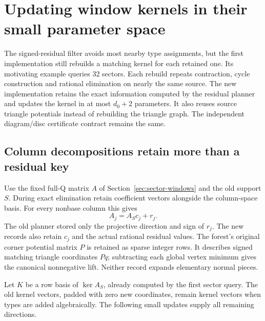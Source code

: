 \section{Updating window kernels in their small parameter space}
\label{sec:window-basis}

The signed-residual filter avoids most nearby type assignments, but the
first implementation still rebuilds a matching kernel for each retained
one. Its motivating example queries 32 sectors. Each rebuild repeats
contraction, cycle construction and rational elimination on nearly the
same source. The new implementation retains the exact information computed
by the residual planner and updates the kernel in at most $d_0+2$
parameters. It also reuses source triangle potentials instead of rebuilding
the triangle graph. The independent diagram/disc certificate contract
remains the same.

\subsection{Column decompositions retain more than a residual key}

Use the fixed full-Q matrix $A$ of Section~\ref{sec:sector-windows} and
the old support $S$. During exact elimination retain coefficient vectors
alongside the column-space basis. For every nonbase column this gives
\[
                 A_j=A_Sc_j+r_j.
\]
The old planner stored only the projective direction and sign of $r_j$.
The new records also retain $c_j$ and the actual rational residual values.
The forest's original corner potential matrix $P$ is retained as sparse
integer rows. It describes signed matching triangle coordinates $Pq$;
subtracting each global vertex minimum gives the canonical nonnegative lift.
Neither record expands elementary normal pieces.

Let $K$ be a row basis of $\ker A_S$, already computed by the first sector
query. The old kernel vectors, padded with zero new coordinates, remain
kernel vectors when types are added algebraically. The following small
updates supply all remaining directions.

